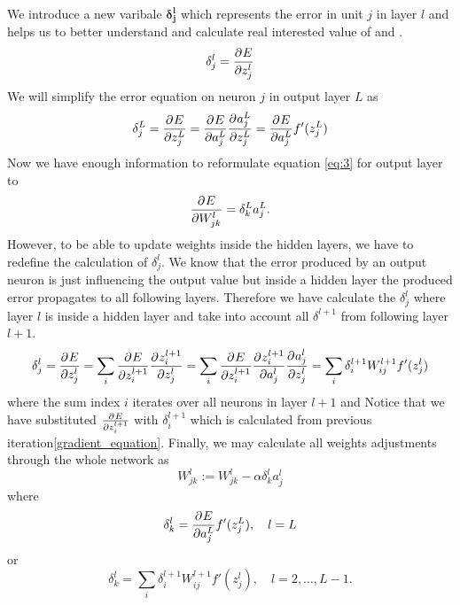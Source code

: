 We introduce a new varibale $\boldsymbol{\delta_j^l}$ which represents the error in unit $j$ in layer $l$ and helps us to better understand and calculate real interested value of  and .
\begin{equation} \label{eq:7}
	\delta_j^l = \frac{\partial^{} E}{\partial z_j^l}
\end{equation}
We will simplify the error equation on neuron $j$ in output layer $L$ as
\begin{equation} \label{eq:8}
  \delta_j^L = \frac{\partial^{} E}{\partial z_j^L} = \frac{\partial^{} E}{\partial a_j^L}\frac{\partial^{} a_j^L}{\partial z_j^L} = \frac{\partial^{} E}{\partial a_j^L}f'(z_j^L)
\end{equation}
Now we have enough information to reformulate equation \ref{eq:3} for output layer to
\begin{equation} \label{eq:9}
	\frac{\partial^{} E}{\partial W_{jk}^l} = \delta_k^{L}a_j^L.
\end{equation}
However, to be able to update weights inside the hidden layers, we have to redefine the calculation of $\delta_j^l$.
We know that the error produced by an output neuron is just influencing the output value but inside a hidden layer the produced error propagates to all following layers.
Therefore we have calculate the $\delta_j^l$ where layer $l$ is inside a hidden layer and take into account all $\delta^{l+1}$ from following layer $l+1$.
\begin{equation} \label{eq:10}
	\delta_j^l =  \frac{\partial^{} E}{\partial z_j^l} = \sum_i\frac{\partial^{} E}{\partial z_i^{l+1}}\frac{\partial^{} z_i^{l+1}}{\partial z_j^{l}} = \sum_i\frac{\partial^{} E}{\partial z_i^{l+1}}\frac{\partial^{} z_i^{l+1}}{\partial a_j^{l}}\frac{\partial^{} a_j^l}{\partial z_j^l}
	= \sum_i\delta_i^{l+1}W_{ij}^{l+1}f'(z_j^l)
\end{equation}
where the sum index $i$ iterates over all neurons in layer $l+1$ and Notice that we have substituted $\frac{\partial^{} E}{\partial z_i^{l+1}}$ with $\delta_i^{l+1}$ which is calculated from previous iteration\ref{gradient_equation}.
\newline
Finally, we may calculate all weights adjustments through the whole network as
\begin{equation} \label{eq:11}
	W_{jk}^l := W_{jk}^l - \alpha\delta_k^{l}a_j^l
\end{equation}
where
\begin{equation} \label{eq:12}
	\delta_k^{l} = \frac{\partial^{} E}{\partial a_j^L}f'(z_j^L), \quad l = L
\end{equation}
or
\begin{equation} \label{eq:13}
	\delta_k^{l} = \sum_i\delta_i^{l+1}W_{ij}^{l+1}f'(z_j^l), \quad l = 2,\ldots, L-1.
\end{equation}

